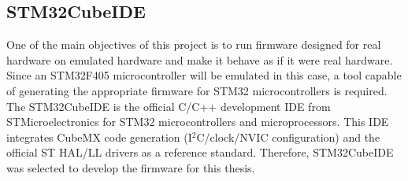 \subsection{STM32CubeIDE}
\label{chap:Back_ARM_STM32CubeIDE}

One of the main objectives of this project is to run firmware designed for real 
hardware on emulated hardware and make it behave as if it were real hardware. 
Since an STM32F405 microcontroller will be emulated in this case, a tool capable 
of generating the appropriate firmware for STM32 microcontrollers is required. The 
STM32CubeIDE is the official C/C++ development IDE from STMicroelectronics 
for STM32 microcontrollers and microprocessors\cite{STM32CubeIDE2026}. This IDE integrates CubeMX 
code generation (I$^2$C/clock/NVIC configuration) and the official ST HAL/LL drivers 
as a reference standard. Therefore, STM32CubeIDE was selected to develop the 
firmware for this thesis.